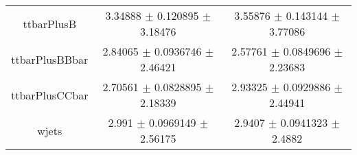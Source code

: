 \begin{table}
\begin{tabular}{ccc}
ttbarPlusB & \num{3.34888} $\pm$ \num{0.120895} $\pm$ \num{3.18476} & \num{3.55876} $\pm$ \num{0.143144} $\pm$ \num{3.77086}\\
ttbarPlusBBbar & \num{2.84065} $\pm$ \num{0.0936746} $\pm$ \num{2.46421} & \num{2.57761} $\pm$ \num{0.0849696} $\pm$ \num{2.23683}\\
ttbarPlusCCbar & \num{2.70561} $\pm$ \num{0.0828895} $\pm$ \num{2.18339} & \num{2.93325} $\pm$ \num{0.0929886} $\pm$ \num{2.44941}\\
wjets & \num{2.991} $\pm$ \num{0.0969149} $\pm$ \num{2.56175} & \num{2.9407} $\pm$ \num{0.0941323} $\pm$ \num{2.4882}\\
\bottomrule
\end{tabular}
\end{table}